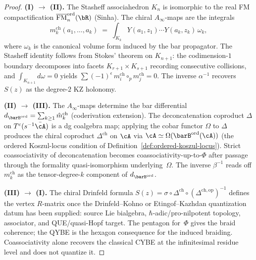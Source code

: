 \begin{proof}
\textbf{(I) $\to$ (II).}
The Stasheff associahedron $K_n$ is isomorphic to the real
FM compactification $\overline{\operatorname{FM}}_n^{\mathrm{ord}}(\bR)$
(Sinha). The chiral $A_\infty$-maps are the integrals
\[
m_k^{\mathrm{ch}}(a_1, \ldots, a_k)
\;=\;
\int_{K_k}
Y(a_1, z_1) \cdots Y(a_k, z_k)\, \omega_k,
\]
where $\omega_k$ is the canonical volume form induced by
the bar propagator. The Stasheff identity follows from
Stokes' theorem on $K_{n+1}$: the codimension-$1$ boundary
decomposes into facets $K_{r+1} \times K_{s+1}$ recording
consecutive collisions, and $\int_{K_{n+1}} d\omega = 0$
yields
$\sum (-1)^\epsilon\, m_i^{\mathrm{ch}} \circ_p
m_j^{\mathrm{ch}} = 0$.
The inverse $\alpha^{-1}$ recovers $S(z)$ as the degree-$2$
KZ holonomy.

\textbf{(II) $\to$ (III).}
The $A_\infty$-maps determine the bar differential
$d_{\barB^{\mathrm{ord}}} = \sum_{k \ge 1}
\hat{m}_k^{\mathrm{ch}}$ (coderivation extension).
The deconcatenation coproduct $\Delta$ on
$T^c(s^{-1}\bar\cA)$ is a dg coalgebra map; applying the
cobar functor $\Omega$ to $\Delta$ produces the chiral
coproduct $\Delta^{\mathrm{ch}}$ on $\cA$ via
$\cA \simeq \Omega(\barB^{\mathrm{ord}}(\cA))$
(the ordered Koszul-locus condition of
Definition~\ref{def:ordered-koszul-locus}).
Strict coassociativity of deconcatenation becomes
coassociativity-up-to-$\Phi$ after passage through the
formality quasi-isomorphism underlying~$\Omega$.
The inverse $\beta^{-1}$ reads off
$m_k^{\mathrm{ch}}$ as the tensor-degree-$k$
component of $d_{\barB^{\mathrm{ord}}}$.

\textbf{(III) $\to$ (I).}
The chiral Drinfeld formula
$S(z) = \sigma \circ \Delta^{\mathrm{ch}}
\circ (\Delta^{\mathrm{ch},\mathrm{op}})^{-1}$
defines the vertex $R$-matrix once the Drinfeld--Kohno or
Etingof--Kazhdan quantization datum has been supplied: source Lie
bialgebra, \(\hbar\)-adic/pro-nilpotent topology, associator, and
QUE/quasi-Hopf target.  The
pentagon for~$\Phi$ gives the braid coherence; the QYBE is the
hexagon consequence for the induced braiding.  Coassociativity alone
recovers the classical CYBE at the infinitesimal residue level and
does not quantize it.
\end{proof}

